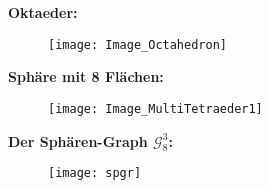 \documentclass{beamer}
\begin{document}
\begin{frame}
\textbf{Oktaeder:}
\begin{figure}
\begin{center}
\texttt{[image: Image\_Octahedron]}
\end{center}
\end{figure}
\end{frame}
\begin{frame}
\textbf{Sphäre mit 8 Flächen:}
\begin{figure}[H]
\begin{center}
\texttt{[image: Image\_MultiTetraeder1]}
\end{center}
\end{figure}
\end{frame}

\begin{frame}

\textbf{Der Sphären-Graph $\mathcal{G}_8^3$:}
\begin{figure}[H]
\begin{center}
\texttt{[image: spgr]}
\end{center}
\end{figure}
\end{frame}
\end{document}
